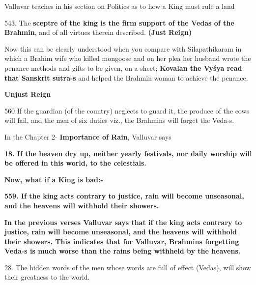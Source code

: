 Valluvar teaches in his section on Politics as to how a King must rule a land

543. The \textbf{sceptre of the king is the firm support of the Vedas of the Brahmin}, and of all virtues therein described. \textbf{(Just Reign)}

Now this can be clearly understood when you compare with Silapathikaram in which a Brahim wife who killed mongoose and on her plea her husband wrote the penance methods and gifts to be given, on a sheet; \textbf{Kovalan the Vyśya read that Sanskrit sūtra-s} and helped the Brahmin woman to achieve the penance.

\textbf{Unjust Reign}

560  If the guardian (of the country) neglects to guard it, the produce of the cows will fail, and the men of six duties viz., the Brahmins will forget the Veda-s.

In the Chapter 2- \textbf{Importance of Rain}, Valluvar says

\textbf{18. If the heaven dry up, neither yearly festivals, nor daily worship will be offered in this world, to the celestials.}

\textbf{Now, what if a King is bad:-}

\textbf{559. If the king acts contrary to justice, rain will become unseasonal, and the heavens will withhold their showers.}

\textbf{In the previous verses Valluvar says that if the king acts contrary to justice, rain will become unseasonal, and the heavens will withhold their showers. This indicates that for Valluvar, Brahmins forgetting Veda-s is much worse than the rains being withheld by the heavens.}

 28. The hidden words of the men whose words are full of effect (Vedas), will show their greatness to the world.

